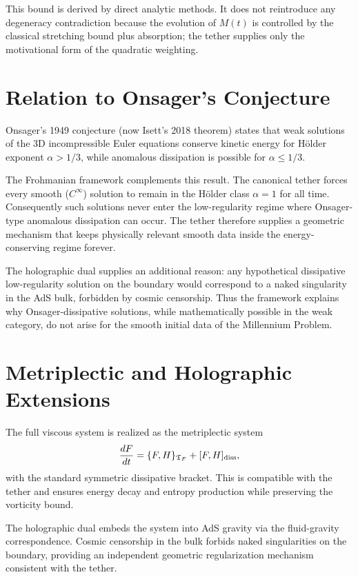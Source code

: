\documentclass[11pt,a4paper]{article}
\begin{document}
This bound is derived by direct analytic methods. It does not reintroduce any degeneracy contradiction because the evolution of \(M(t)\) is controlled by the classical stretching bound plus absorption; the tether supplies only the motivational form of the quadratic weighting.

\section{Relation to Onsager's Conjecture}

Onsager's 1949 conjecture (now Isett's 2018 theorem) states that weak solutions of the 3D incompressible Euler equations conserve kinetic energy for Hölder exponent \(\alpha > 1/3\), while anomalous dissipation is possible for \(\alpha \le 1/3\).

The Frohmanian framework complements this result. The canonical tether forces every smooth (\(C^\infty\)) solution to remain in the Hölder class \(\alpha = 1\) for all time. Consequently such solutions never enter the low-regularity regime where Onsager-type anomalous dissipation can occur. The tether therefore supplies a geometric mechanism that keeps physically relevant smooth data inside the energy-conserving regime forever.

The holographic dual supplies an additional reason: any hypothetical dissipative low-regularity solution on the boundary would correspond to a naked singularity in the AdS bulk, forbidden by cosmic censorship. Thus the framework explains why Onsager-dissipative solutions, while mathematically possible in the weak category, do not arise for the smooth initial data of the Millennium Problem.

\section{Metriplectic and Holographic Extensions}

The full viscous system is realized as the metriplectic system
\[
\frac{dF}{dt} = \{F, H\}_{\mathfrak{T}_F} + [F, H]_{\rm diss},
\]
with the standard symmetric dissipative bracket. This is compatible with the tether and ensures energy decay and entropy production while preserving the vorticity bound.

The holographic dual embeds the system into AdS gravity via the fluid-gravity correspondence. Cosmic censorship in the bulk forbids naked singularities on the boundary, providing an independent geometric regularization mechanism consistent with the tether.
\end{document}

